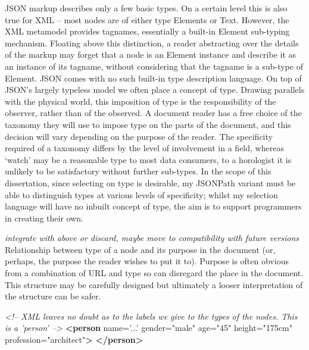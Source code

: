 \documentclass[]{article}
\newenvironment{Shaded}{}{}
\newcommand{\KeywordTok}[1]{\textcolor[rgb]{0.00,0.44,0.13}{\textbf{{#1}}}}
\newcommand{\StringTok}[1]{\textcolor[rgb]{0.25,0.44,0.63}{{#1}}}
\newcommand{\CommentTok}[1]{\textcolor[rgb]{0.38,0.63,0.69}{\textit{{#1}}}}
\newcommand{\OtherTok}[1]{\textcolor[rgb]{0.00,0.44,0.13}{{#1}}}
\begin{document}
JSON markup describes only a few basic types. On a certain level this is
also true for XML -- most nodes are of either type Elements or Text.
However, the XML metamodel provides tagnames, essentially a built-in
Element sub-typing mechanism. Floating above this distinction, a reader
abstracting over the details of the markup may forget that a node is an
Element instance and describe it as an instance of its tagname, without
considering that the tagname is a sub-type of Element. JSON comes with
no such built-in type description language. On top of JSON's largely
typeless model we often place a concept of type. Drawing parallels with
the physical world, this imposition of type is the responsibility of the
observer, rather than of the observed. A document reader has a free
choice of the taxonomy they will use to impose type on the parts of the
document, and this decision will vary depending on the purpose of the
reader. The specificity required of a taxonomy differs by the level of
involvement in a field, whereas `watch' may be a reasonable type to most
data consumers, to a horologist it is unlikely to be satisfactory
without further sub-types. In the scope of this dissertation, since
selecting on type is desirable, my JSONPath variant must be able to
distinguish types at various levels of specificity; whilst my selection
language will have no inbuilt concept of type, the aim is to support
programmers in creating their own.

\emph{integrate with above or discard, maybe move to compatibility with
future versions} Relationship between type of a node and its purpose in
the document (or, perhaps, the purpose the reader wishes to put it to).
Purpose is often obvious from a combination of URL and type so can
disregard the place in the document. This structure may be carefully
designed but ultimately a looser interpretation of the structure can be
safer.

\begin{Shaded}
\begin{Highlighting}[]
\CommentTok{<!--  XML leaves no doubt as to the labels we give to the types}
\CommentTok{      of the nodes. This is a 'person' -->}
\KeywordTok{<person}\OtherTok{  name=}\StringTok{'...'}\OtherTok{ gender=}\StringTok{"male"}
\OtherTok{         age=}\StringTok{"45"}\OtherTok{ height=}\StringTok{"175cm"}\OtherTok{ profession=}\StringTok{"architect"}\KeywordTok{>}
\KeywordTok{</person>}
\end{Highlighting}
\end{Shaded}
\end{document}
